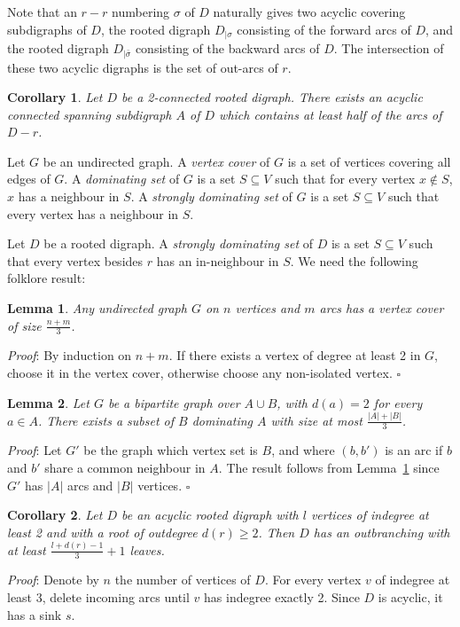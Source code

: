 \documentclass{article}
\newtheorem{lemma}{Lemma}
\newtheorem{coro}{Corollary}
\begin{document}
Note that an $r-r$ numbering $\sigma$ of $D$ naturally gives two acyclic covering subdigraphs of $D$, the rooted digraph $D_{|\sigma}$ consisting of the forward arcs of $D$, and the rooted digraph $D_{|\bar{\sigma}}$ consisting of the backward arcs of $D$. The intersection of these two acyclic digraphs is the set of out-arcs of $r$.

\begin{coro}
Let $D$ be a 2-connected rooted digraph. There exists an acyclic connected spanning subdigraph $A$ of $D$ which contains at least half of the arcs of $D-r$.
\end{coro}
Let $G$ be an undirected graph. A \emph{vertex cover} of $G$ is a set of vertices covering all edges of $G$. A \emph{dominating set} of $G$ is a set $S\subseteq V$ such that for every vertex $x\notin S$, $x$ has a neighbour in $S$. A \emph{strongly dominating set} of $G$ is a set $S\subseteq V$ such that every vertex has a neighbour in $S$.

Let $D$ be a rooted digraph. A \emph{strongly dominating set} of $D$ is a set $S\subseteq V$ such that every vertex besides $r$ has an in-neighbour in $S$.
We need the following folklore result:
\begin{lemma}\label{domi1}
Any undirected graph $G$ on $n$ vertices and $m$ arcs has a vertex cover of size $\frac{n+m}{3}$.
\end{lemma}
\emph{Proof}: By induction on $n+m$. If there exists a vertex of degree at least 2 in $G$, choose it in the vertex cover, otherwise choose any non-isolated vertex.
$\square$

\begin{lemma}\label{domi2}
Let $G$ be a bipartite graph over $A\cup B$, with $d(a)= 2$ for every $a\in A$. There exists a subset of $B$ dominating $A$ with size at most $\frac{|A|+|B|}{3}$.
\end{lemma}
\emph{Proof}:
Let $G'$ be the graph which vertex set is $B$, and where $(b,b')$ is an arc if $b$ and $b'$ share a common neighbour in $A$. The result follows from Lemma~\ref{domi1} since $G'$ has $|A|$ arcs and $|B|$ vertices.
$\square$


\begin{coro}\label{leaves}
Let $D$ be an acyclic rooted digraph with $l$ vertices of indegree at least 2 and with a root of outdegree $d(r)\ge 2$. Then $D$ has an outbranching with at least $\frac{l+d(r)-1}{3}+1$ leaves.
\end{coro}
\emph{Proof}: Denote by $n$ the number of vertices of $D$. For every vertex $v$ of indegree at least 3, delete incoming arcs until $v$ has indegree exactly 2. Since $D$ is acyclic, it has a sink $s$. 
\end{document}
